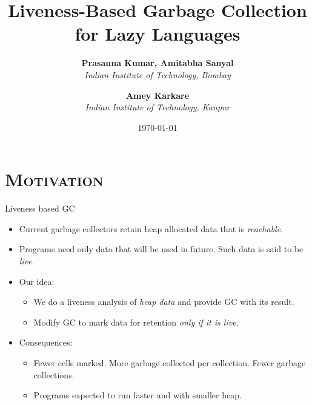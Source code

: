 \documentclass[xcolor=x11names,compress,mathserif]{beamer}
\renewcommand{\(}{\begin{columns}}
\renewcommand{\)}{\end{columns}}
\newcommand{\<}[1]{\begin{column}{#1}}
\renewcommand{\>}{\end{column}}
\begin{document}
\section{\scshape Motivation}
\begin{frame}
\title{Liveness-Based Garbage Collection for Lazy Languages}
\author{
        {\bf Prasanna Kumar, Amitabha Sanyal}\\{\it Indian Institute of
          Technology, Bombay}\\ \and
       {\bf Amey Karkare}\\{\it Indian Institute of Technology, Kanpur}
}

\date{\today}
\titlepage
\end{frame}



\begin{frame}{Liveness based GC}
    \begin{itemize}\itemsep0.75em
    \item Current garbage collectors retain heap allocated data
      that  is {\em  reachable}.
    \item Programs need only data that will be used in future.
      Such data is said to be {\em live}.
    \item Our idea: 
      \begin{itemize}
      \item We do  a liveness analysis of {\em heap  data} and provide
        GC with its result.
      \item Modify GC to mark data for retention {\em only if it is live}.
      \end{itemize}
    \item Consequences:
      \begin{itemize}
      \item  Fewer cells  marked.  \pause More  garbage collected  per
        collection. \pause Fewer garbage collections. \pause
      \item Programs expected to run faster and with smaller heap.
      \end{itemize}
    \end{itemize}
\end{frame}
\end{document}
